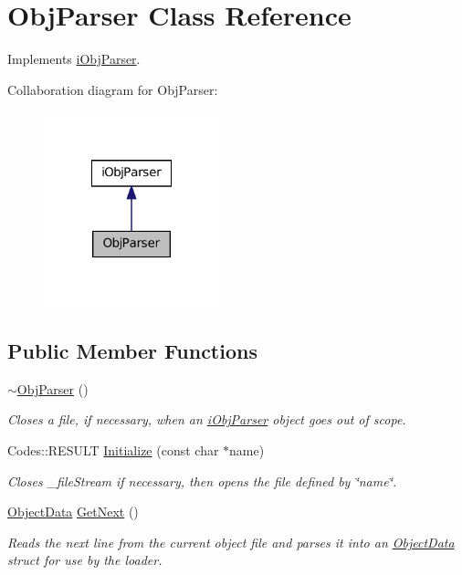 \hypertarget{classObjParser}{
\section{ObjParser Class Reference}
\label{classObjParser}
}


Implements \hyperlink{classiObjParser}{iObjParser}.  




Collaboration diagram for ObjParser:\nopagebreak
\begin{figure}[H]
\begin{center}
\leavevmode
\includegraphics[width=144pt]{classObjParser__coll__graph}
\end{center}
\end{figure}
\subsection*{Public Member Functions}
\begin{DoxyCompactItemize}
\item 
\hypertarget{classObjParser_aea8cf97813333011fcfa8ed67327009d}{
\hyperlink{classObjParser_aea8cf97813333011fcfa8ed67327009d}{$\sim$ObjParser} ()}
\label{classObjParser_aea8cf97813333011fcfa8ed67327009d}

\begin{DoxyCompactList}\small\item\em Closes a file, if necessary, when an \hyperlink{classiObjParser}{iObjParser} object goes out of scope. \item\end{DoxyCompactList}\item 
Codes::RESULT \hyperlink{classObjParser_ae8d9939f390a68901e256d8a3187c24a}{Initialize} (const char $\ast$name)
\begin{DoxyCompactList}\small\item\em Closes \_\-fileStream if necessary, then opens the file defined by \char`\"{}name\char`\"{}. \item\end{DoxyCompactList}\item 
\hyperlink{structObjectData}{ObjectData} \hyperlink{classObjParser_a653f83071fd63e3fdf04f28699f2fff5}{GetNext} ()
\begin{DoxyCompactList}\small\item\em Reads the next line from the current object file and parses it into an \hyperlink{structObjectData}{ObjectData} struct for use by the loader. \item\end{DoxyCompactList}\end{DoxyCompactItemize}
